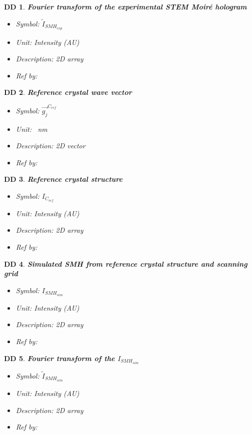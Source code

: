 \documentclass[12pt]{article}
\newtheorem{DD}{DD}
\begin{document}
\begin{DD}
\normalfont \textbf{Fourier transform of the experimental STEM Moir{\'e} hologram}
\begin{itemize}
\item {Symbol}: $\widetilde{I}_{SMH_{exp}}$ 
\item {Unit}: Intensity (AU)
\item {Description}: 2D array
\item {Ref by}:
\end{itemize}
\label{DD_2}
\end{DD}

\begin{DD}
\normalfont \textbf{Reference crystal wave vector}
\begin{itemize}
\item {Symbol}: $\overrightarrow{g_{j}}^{C_{ref}}$ 
\item {Unit}: \si{\per\nano\metre}
\item {Description}: 2D vector
\item {Ref by}:
\end{itemize}
\label{DD_3}
\end{DD}

\begin{DD}
\normalfont \textbf{Reference crystal structure}
\begin{itemize}
\item {Symbol}: $I_{C_{ref}}$
\item {Unit}: Intensity (AU)
\item {Description}: 2D array
\item {Ref by}:
\end{itemize}
\label{DD_4}
\end{DD}

\begin{DD}
\normalfont \textbf{Simulated SMH from reference crystal structure and scanning grid}
\begin{itemize}
\item {Symbol}: $I_{SMH_{sim}}$
\item {Unit}: Intensity (AU)
\item {Description}: 2D array
\item {Ref by}:
\end{itemize}
\label{DD_5}
\end{DD}

\begin{DD}
\normalfont \textbf{Fourier transform of the $I_{SMH_{sim}}$}
\begin{itemize}
\item {Symbol}: $\widetilde{I}_{SMH_{sim}}$
\item {Unit}: Intensity (AU)
\item {Description}: 2D array
\item {Ref by}:
\end{itemize}
\label{DD_6}
\end{DD}
\end{document}
